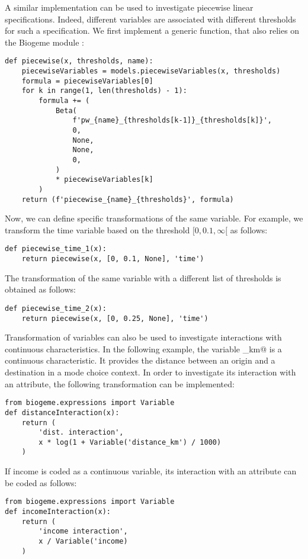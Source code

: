 \documentclass[12pt,a4paper]{article}
\begin{document}
A similar implementation can be used to investigate piecewise linear
specifications. Indeed, different variables are associated with
different thresholds for such a specification. We first implement a
generic function, that also relies on the Biogeme module
\lstinline@models@:
\begin{lstlisting}
def piecewise(x, thresholds, name):
    piecewiseVariables = models.piecewiseVariables(x, thresholds)
    formula = piecewiseVariables[0]
    for k in range(1, len(thresholds) - 1):
        formula += (
            Beta(
                f'pw_{name}_{thresholds[k-1]}_{thresholds[k]}',
                0,
                None,
                None,
                0,
            )
            * piecewiseVariables[k]
        )
    return (f'piecewise_{name}_{thresholds}', formula)
\end{lstlisting}
Now, we can define specific transformations of the same variable. For
example, we transform the time variable based on the threshold $[0,
  0.1, \infty[$ as follows:
    \begin{lstlisting}
def piecewise_time_1(x):
    return piecewise(x, [0, 0.1, None], 'time')
    \end{lstlisting}
The transformation of the same variable with a different list of
thresholds is obtained as follows:
\begin{lstlisting}
def piecewise_time_2(x):
    return piecewise(x, [0, 0.25, None], 'time')
\end{lstlisting}

Transformation of variables can also be used to investigate
interactions with continuous characteristics. In the following
example, the variable \lstinline@distance_km@ is a continuous
characteristic. It provides the distance between an origin and a
destination in a mode choice context. In order to investigate its
interaction with an attribute, the following transformation can be
implemented:
\begin{lstlisting}
from biogeme.expressions import Variable
def distanceInteraction(x):
    return (
        'dist. interaction',
        x * log(1 + Variable('distance_km') / 1000)
    )
\end{lstlisting}
If income is coded as a continuous variable, its interaction with an
attribute can be coded as follows: 
\begin{lstlisting}
from biogeme.expressions import Variable
def incomeInteraction(x):
    return (
        'income interaction',
        x / Variable('income)
    )
\end{lstlisting}





\end{document}

